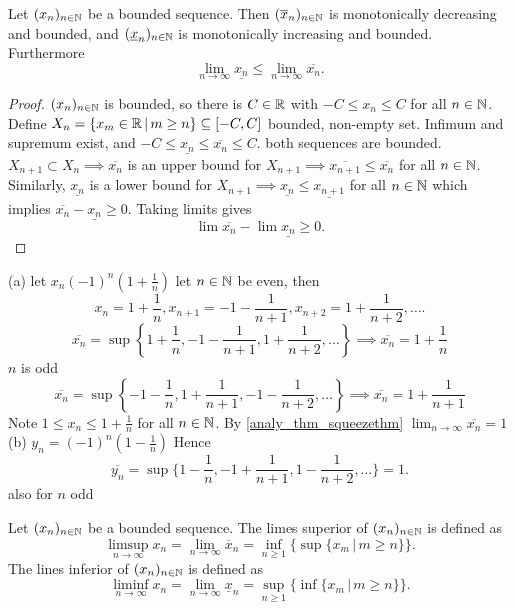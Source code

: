\documentclass[10pt, a4paper]{article}
\newcommand{\seq}[1][x]{(#1_n)_{n \in \N}}
\begin{document}
\begin{lemma}
    Let $\seq$ be a bounded sequence.
    Then $\seq[\overline{x}]$ is monotonically decreasing and bounded,
    and $\seq[\underline{x}]$ is monotonically increasing and bounded.
    Furthermore
    \[
    \lim_{n \rightarrow \infty}\underline{x_n} \leq \lim_{n \rightarrow \infty}\overline{x_n}.
    \]
    \begin{proof}
        $\seq$ is bounded,
        so there is $C \in \mathbb{R}$ with $-C \leq x_n \leq C$ for all $n \in \mathbb{N}$.
        Define $X_n = \{x_m \in \mathbb{R}\,|\, m \geq n\} \subseteq [-C, C]$ bounded,
        non-empty set.
        Infimum and supremum exist,
        and $-C \leq \underline{x_n} \leq \overline{x_n} \leq C$.
        both sequences are bounded.
        $X_{n + 1} \subset X_n \implies \overline{x_n}$ is an upper bound for $X_{n + 1} \implies \overline{x_{n + 1}} \leq \overline{x_n}$ for all $n \in \mathbb{N}$.
        Similarly,
        $\underline{x_n}$ is a lower bound for $X_{n + 1} \implies \underline{x_n} \leq \underline{x_{n + 1}}$ for all $n \in \mathbb{N}$ which implies $\overline{x_n} - \underline{x_n} \geq 0$.
        Taking limits gives
        \[
        \lim\overline{x_n} - \lim\underline{x_n} \geq 0.
        \]
    \end{proof}
\end{lemma}

\begin{example}
    (a) let $x_n (-1) ^ n \left(1 + \frac{1}{n}\right)$
    let $n \in \mathbb{N}$ be even,
    then
    \[
    x_n = 1 + \frac{1}{n}, x_{n + 1} = -1 - \frac{1}{n + 1}, x_{n + 2} = 1 + \frac{1}{n + 2}, \dotsc.
    \]
    \[
    \overline{x_n} = \sup\left\{1 + \frac{1}{n}, -1 - \frac{1}{n + 1}, 1 + \frac{1}{n + 2}, \dotsc\right\} \implies \overline{x_n} = 1 + \frac{1}{n}
    \]
    $n$ is odd
    \[
    \overline{x_n} = \sup\left\{-1 - \frac{1}{n}, 1 + \frac{1}{n + 1}, -1 - \frac{1}{n + 2}, \dotsc\right\} \implies \overline{x_n} = 1 + \frac{1}{n + 1}
    \]
    Note $1 \leq x_n \leq 1 + \frac{1}{n}$ for all $n \in \mathbb{N}$.
    By \autoref{analy_thm_squeezethm} $\lim_{n \rightarrow \infty}\overline{x_n} = 1$
    (b) $y_n = (-1) ^ n(1 - \frac{1}{n})$
    Hence
    \[
    \overline{y_n} = \sup\{1 - \frac{1}{n}, -1 + \frac{1}{n + 1}, 1 - \frac{1}{n + 2}, \dotsc\} = 1.
    \]
    also for $n$ odd
\end{example}

\begin{definition}
    Let $\seq$ be a bounded sequence.
    The limes superior of $\seq$ is defined as
    \[
    \limsup_{n \rightarrow \infty}{x_n} = \lim_{n \rightarrow \infty}\overline{x}_n = \inf_{n \geq 1}\{\sup{\{x_m\,|\, m \geq n\}}\}.
    \]
    The lines inferior of $\seq$ is defined as
    \[
    \liminf_{n \rightarrow \infty}{x_n} = \lim_{n \rightarrow \infty}{\underline{x}_n} = \sup_{n \geq 1}{\{\inf{\{x_m\,|\, m \geq n\}}\}}.
    \]
\end{definition}
\end{document}
